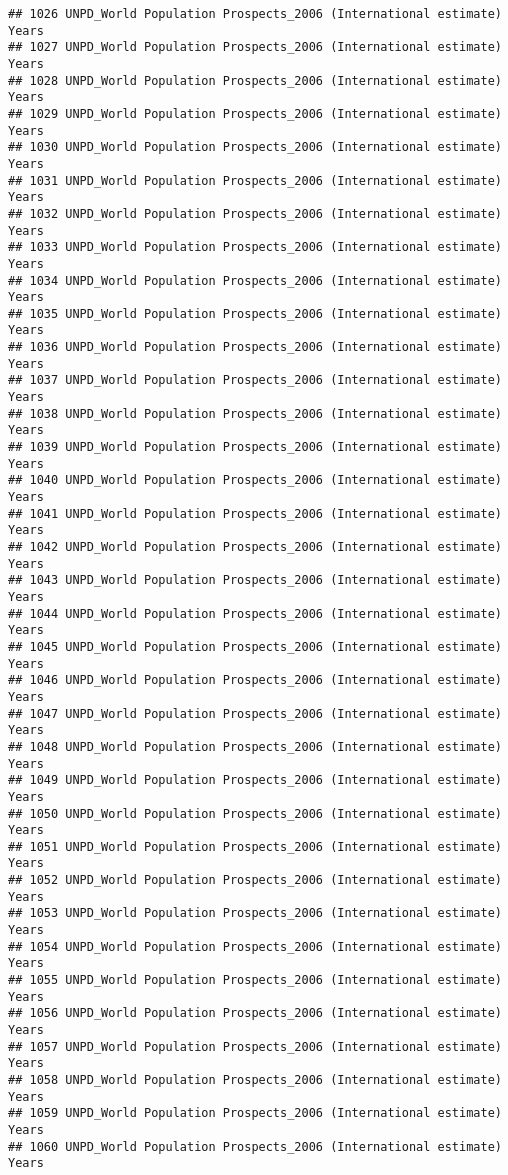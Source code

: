 \documentclass[]{article}
\begin{document}
\begin{verbatim}
## 1026 UNPD_World Population Prospects_2006 (International estimate) Years
## 1027 UNPD_World Population Prospects_2006 (International estimate) Years
## 1028 UNPD_World Population Prospects_2006 (International estimate) Years
## 1029 UNPD_World Population Prospects_2006 (International estimate) Years
## 1030 UNPD_World Population Prospects_2006 (International estimate) Years
## 1031 UNPD_World Population Prospects_2006 (International estimate) Years
## 1032 UNPD_World Population Prospects_2006 (International estimate) Years
## 1033 UNPD_World Population Prospects_2006 (International estimate) Years
## 1034 UNPD_World Population Prospects_2006 (International estimate) Years
## 1035 UNPD_World Population Prospects_2006 (International estimate) Years
## 1036 UNPD_World Population Prospects_2006 (International estimate) Years
## 1037 UNPD_World Population Prospects_2006 (International estimate) Years
## 1038 UNPD_World Population Prospects_2006 (International estimate) Years
## 1039 UNPD_World Population Prospects_2006 (International estimate) Years
## 1040 UNPD_World Population Prospects_2006 (International estimate) Years
## 1041 UNPD_World Population Prospects_2006 (International estimate) Years
## 1042 UNPD_World Population Prospects_2006 (International estimate) Years
## 1043 UNPD_World Population Prospects_2006 (International estimate) Years
## 1044 UNPD_World Population Prospects_2006 (International estimate) Years
## 1045 UNPD_World Population Prospects_2006 (International estimate) Years
## 1046 UNPD_World Population Prospects_2006 (International estimate) Years
## 1047 UNPD_World Population Prospects_2006 (International estimate) Years
## 1048 UNPD_World Population Prospects_2006 (International estimate) Years
## 1049 UNPD_World Population Prospects_2006 (International estimate) Years
## 1050 UNPD_World Population Prospects_2006 (International estimate) Years
## 1051 UNPD_World Population Prospects_2006 (International estimate) Years
## 1052 UNPD_World Population Prospects_2006 (International estimate) Years
## 1053 UNPD_World Population Prospects_2006 (International estimate) Years
## 1054 UNPD_World Population Prospects_2006 (International estimate) Years
## 1055 UNPD_World Population Prospects_2006 (International estimate) Years
## 1056 UNPD_World Population Prospects_2006 (International estimate) Years
## 1057 UNPD_World Population Prospects_2006 (International estimate) Years
## 1058 UNPD_World Population Prospects_2006 (International estimate) Years
## 1059 UNPD_World Population Prospects_2006 (International estimate) Years
## 1060 UNPD_World Population Prospects_2006 (International estimate) Years

\end{verbatim}
\end{document}
